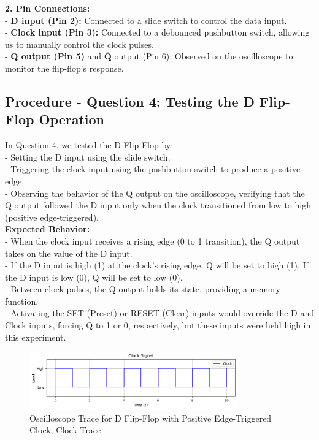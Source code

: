 \documentclass{article}
\begin{document}
    \textbf{2. Pin Connections:} \\ 
    - \textbf{D input (Pin 2):} Connected to a slide switch to control the data input.
    \\
    - \textbf{Clock input (Pin 3):} Connected to a debounced pushbutton switch, allowing us to manually control the clock pulses.
    \\
    - \textbf{Q output (Pin 5)} and \(\overline{\textbf{Q}}\) output (Pin 6): Observed on the oscilloscope to monitor the flip-flop’s response.
    \\

    \subsection*{\textbf{Procedure - Question 4: Testing the D Flip-Flop Operation}}
    In Question 4, we tested the D Flip-Flop by: \\
    - Setting the D input using the slide switch.
    \\
    - Triggering the clock input using the pushbutton switch to produce a positive edge.
    \\
    - Observing the behavior of the Q output on the oscilloscope, verifying that the Q output followed the D input only when the clock transitioned from low to high (positive edge-triggered).
    \\

    \textbf{Expected Behavior:} \\ 
    - When the clock input receives a rising edge (0 to 1 transition), the Q output takes on the value of the D input.
    \\
    - If the D input is high (1) at the clock’s rising edge, Q will be set to high (1). If the D input is low (0), Q will be set to low (0).
    \\
    - Between clock pulses, the Q output holds its state, providing a memory function.
    \\
    - Activating the SET (Preset) or RESET (Clear) inputs would override the D and Clock inputs, forcing Q to 1 or 0, respectively, but these inputs were held high in this experiment.
    \\

    \begin{figure}[H]
        \centering
        \includegraphics[width=0.8\textwidth]{./img/Lab 11/11_3_1.png}  %
        \caption{Oscilloscope Trace for D Flip-Flop with Positive Edge-Triggered Clock, Clock Trace}
        \label{fig:D_FlipFlop_Oscilloscope_1}
    \end{figure}
\end{document}
